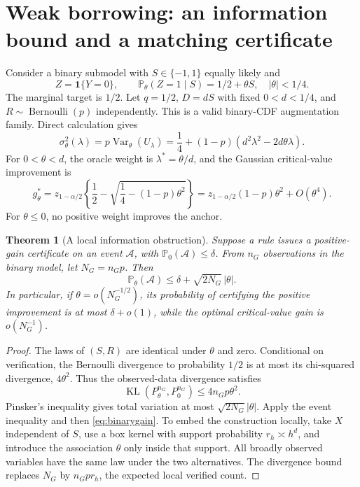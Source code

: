 \documentclass[11pt]{article}
\newtheorem{theorem}{Theorem}
\theoremstyle{remark}\newtheorem{remark}[theorem]{Remark}
\newcommand{\Pp}{\mathbb P}
\newcommand{\ind}{\mathbf 1}
\newcommand{\Var}{\operatorname{Var}}
\newcommand{\KL}{\operatorname{KL}}
\begin{document}
\section{Weak borrowing: an information bound and a matching certificate}
Consider a binary submodel with $S\in\{-1,1\}$ equally likely and
\[
 Z=\ind\{Y=0\},\qquad \Pp_\theta(Z=1\mid S)=1/2+\theta S,
 \quad |\theta|<1/4.
\]
The marginal target is $1/2$. Let $q=1/2$, $D=dS$ with fixed $0<d<1/4$, and $R\sim\operatorname{Bernoulli}(p)$ independently. This is a valid binary-CDF augmentation family. Direct calculation gives
\begin{equation}
 \sigma_\theta^2(\lambda)
 =p\Var_\theta(U_\lambda)
 =\frac14+(1-p)(d^2\lambda^2-2d\theta\lambda).
 \label{eq:binaryvar}
\end{equation}
For $0<\theta<d$, the oracle weight is $\lambda^*=\theta/d$, and the Gaussian critical-value improvement is
\begin{equation}
 g_\theta^*=z_{1-\alpha/2}\left\{\frac12-\sqrt{\frac14-(1-p)\theta^2}\right\}
 =z_{1-\alpha/2}(1-p)\theta^2+O(\theta^4).
 \label{eq:binarygain}
\end{equation}
For $\theta\leq0$, no positive weight improves the anchor.

\begin{theorem}[A local information obstruction]\label{thm:lower}
Suppose a rule issues a positive-gain certificate on an event $\mathcal A$, with $\Pp_0(\mathcal A)\leq\delta$.
From $n_G$ observations in the binary model, let $N_G=n_Gp$. Then
\begin{equation}
 \Pp_\theta(\mathcal A)\leq\delta+\sqrt{2N_G}\,|\theta|.
 \label{eq:power}
\end{equation}
In particular, if $\theta=o(N_G^{-1/2})$, its probability of certifying the positive improvement is at most $\delta+o(1)$, while the optimal critical-value gain is $o(N_G^{-1})$.
\end{theorem}
\begin{proof}
The laws of $(S,R)$ are identical under $\theta$ and zero. Conditional on verification, the Bernoulli divergence to probability $1/2$ is at most its chi-squared divergence, $4\theta^2$. Thus the observed-data divergence satisfies
\[
 \KL(P_\theta^{n_G},P_0^{n_G})\leq4n_Gp\theta^2.
\]
Pinsker's inequality gives total variation at most $\sqrt{2N_G}|\theta|$. Apply the event inequality and then \eqref{eq:binarygain}.
To embed the construction locally, take $X$ independent of $S$, use a box kernel with support probability $r_h\asymp h^d$, and introduce the association $\theta$ only inside that support. All broadly observed variables have the same law under the two alternatives. The divergence bound replaces $N_G$ by $n_Gpr_h$, the expected local verified count.
\end{proof}
\end{document}

